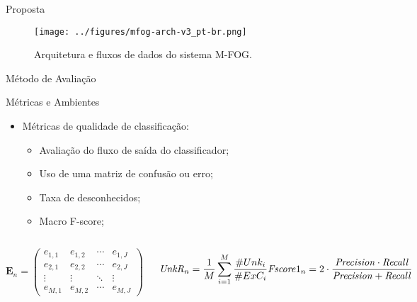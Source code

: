 \documentclass[aspectratio=43,10pt]{beamer}
\newcommand{\mfog}{sistema M-FOG\xspace}
\begin{document}
\begin{frame}[fragile]{Proposta}
  \vspace{-0.5cm}
  \begin{figure}[h]
    \centering
    \hspace*{-0.9cm}
    \texttt{[image: ../figures/mfog-arch-v3\_pt-br.png]}
    \caption{Arquitetura e fluxos de dados do \mfog.}
    \label{fig:arch}
  \end{figure}
\end{frame}

\begin{frame}[fragile]{Método de Avaliação}
  \begin{alertblock}{Métricas e Ambientes}
    \begin{itemize}
      \item Métricas de qualidade de classificação:
      \begin{itemize}
        \item Avaliação do fluxo de saída do classificador;
        \item Uso de uma matriz de confusão ou erro;
        \item Taxa de desconhecidos;
        \item Macro F-score;
      \end{itemize}
    \end{itemize}
  \end{alertblock}

  \begin{columns}[T,onlytextwidth]
    \begin{equation*}
      \mathbf{E}_n = \begin{pmatrix}
        e_{1,1} & e_{1,2} & \cdots & e_{1,J} \\
        e_{2,1} & e_{2,2} & \cdots & e_{2,J} \\
        \vdots  & \vdots  & \ddots & \vdots  \\
        e_{M,1} & e_{M,2} & \cdots & e_{M,J} 
      \end{pmatrix}
    \end{equation*}

    
    
    
    \begin{equation*}
        \mathit{UnkR}_n      = \frac{1}{M} \sum_{i=1}^{M} \frac{\#Unk_i}{\#ExC_i} \\
        \mathit{Fscore}1_n   = 2 \cdot \frac{
          \mathit{Precision} \cdot \mathit{Recall}
          }{
            \mathit{Precision} +\mathit{Recall}
          }
    \end{equation*}
  \end{columns}
\end{frame}
\end{document}
